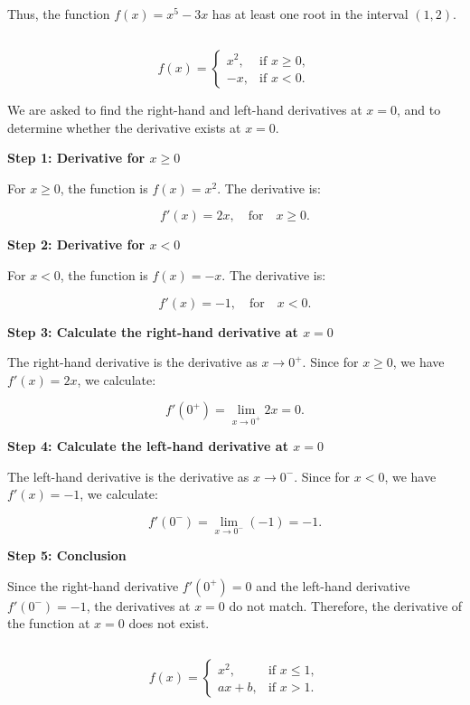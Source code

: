 \documentclass{article}
\begin{document}
Thus, the function \( f(x) = x^5 - 3x \) has at least one root in the interval \( (1, 2) \).
\subsection{}
\[
f(x) =
\begin{cases}
	x^2, & \text{if } x \geq 0, \\
	-x, & \text{if } x < 0.
\end{cases}
\]

We are asked to find the right-hand and left-hand derivatives at \( x = 0 \), and to determine whether the derivative exists at \( x = 0 \).

\textbf{Step 1: Derivative for \( x \geq 0 \)}

For \( x \geq 0 \), the function is \( f(x) = x^2 \). The derivative is:

\[
f'(x) = 2x, \quad \text{for} \quad x \geq 0.
\]

\textbf{Step 2: Derivative for \( x < 0 \)}

For \( x < 0 \), the function is \( f(x) = -x \). The derivative is:

\[
f'(x) = -1, \quad \text{for} \quad x < 0.
\]

\textbf{Step 3: Calculate the right-hand derivative at \( x = 0 \)}

The right-hand derivative is the derivative as \( x \to 0^+ \). Since for \( x \geq 0 \), we have \( f'(x) = 2x \), we calculate:

\[
f'(0^+) = \lim_{x \to 0^+} 2x = 0.
\]

\textbf{Step 4: Calculate the left-hand derivative at \( x = 0 \)}

The left-hand derivative is the derivative as \( x \to 0^- \). Since for \( x < 0 \), we have \( f'(x) = -1 \), we calculate:

\[
f'(0^-) = \lim_{x \to 0^-} (-1) = -1.
\]

\textbf{Step 5: Conclusion}

Since the right-hand derivative \( f'(0^+) = 0 \) and the left-hand derivative \( f'(0^-) = -1 \), the derivatives at \( x = 0 \) do not match. Therefore, the derivative of the function at \( x = 0 \) does not exist.
\subsection{}
\[
f(x) =
\begin{cases}
	x^2, & \text{if } x \leq 1, \\
	ax + b, & \text{if } x > 1.
\end{cases}
\]
\end{document}
